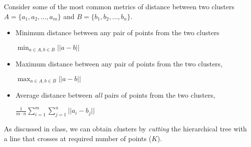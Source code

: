 \documentclass[solution,addpoints,12pt]{exam}
\begin{document}
\begin{questions}
Consider some of the most common metrics of distance between two clusters $A = \{a_1, a_2, \ldots, a_m\}$ and  $B = \{b_1, b_2, \ldots, b_n\}$.
\begin{itemize}
    \item Minimum distance between any pair of points from the two clusters
		\begin{center}
		   $ \min_{a \in A, b \in B} || a - b || $	
		\end{center}	 
	\item Maximum distance between any pair of points from the two clusters,   
		\begin{center}
		   $ \max_{a \in A, b \in B} || a - b || $	
		\end{center}	 
	\item Average distance between \textit{all} pairs of points from the two clusters,   
		\begin{center}
		   $ \frac{1}{m\cdot n} \sum_{i=1}^m \sum_{j=1}^n  || a_i - b_j || $	
		\end{center}	 
\end{itemize}
As discussed in class, we can obtain clusters by \textit{cutting} the hierarchical tree with a line that crosses at required number of points ($K$).

\end{questions}
\end{document}

